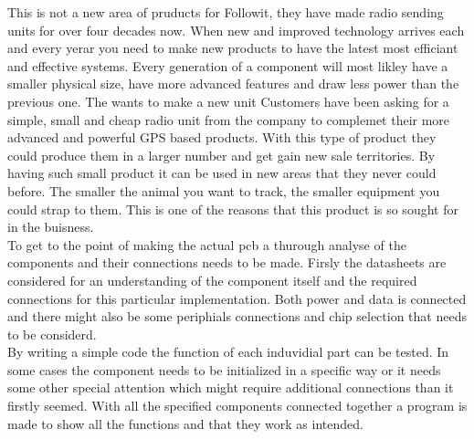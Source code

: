 
This is not a new area of pruducts for Followit, they have made radio sending units for over four decades now.
When new and improved technology arrives each and every yerar you need to make new products to have the latest most efficiant and effective systems. Every generation of a component will most likley have a smaller physical size, have more advanced features and draw less power than the previous one. The wants to make a new unit 
Customers have been asking for a simple, small and cheap radio unit from the company to complemet their more advanced and powerful GPS based products. With this type of product they could produce them in a larger number and get gain new sale territories. By having such small product it can be used in new areas that they never could before. The smaller the animal you want to track, the smaller equipment you could strap to them. This is one of the reasons that this product is so sought for in the buisness. \\
To get to the point of making the actual \gls{pcb} a thurough analyse of the components and their connections needs to be made. Firsly the datasheets are considered for an understanding of the component itself and the required connections for this particular implementation. Both power and data is connected and there might also be some periphials connections and chip selection that needs to be considerd. \\
By writing a simple code the function of each induvidial part can be tested.  In some cases the component needs to be initialized in a specific way or it needs some other special attention which might require additional connections than it firstly seemed.
With all the specified components connected together a program is made to show all the functions and that they work as intended. 

\thispagestyle{empty}